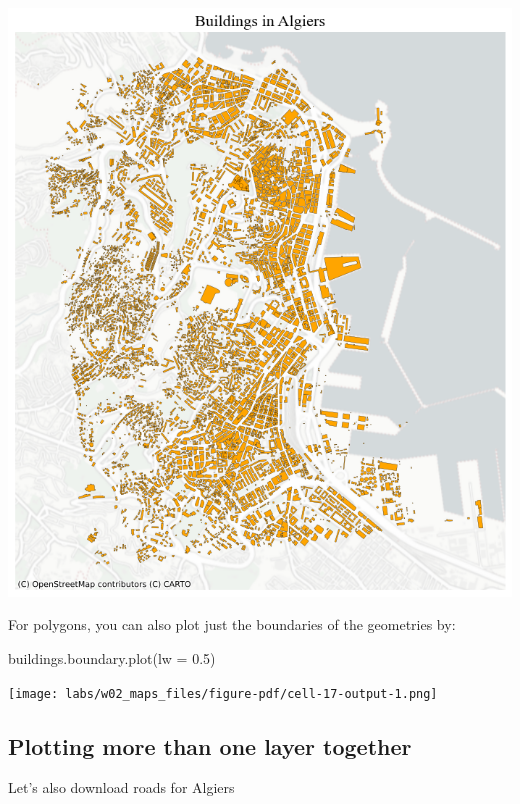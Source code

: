 \documentclass[
  letterpaper,
  DIV=11,
  numbers=noendperiod]{scrreprt}
\newenvironment{Shaded}{\begin{snugshade}}{\end{snugshade}}
\newcommand{\FloatTok}[1]{\textcolor[rgb]{0.68,0.00,0.00}{#1}}
\newcommand{\NormalTok}[1]{\textcolor[rgb]{0.00,0.23,0.31}{#1}}
\newcommand{\OperatorTok}[1]{\textcolor[rgb]{0.37,0.37,0.37}{#1}}
\begin{document}
\includegraphics{labs/w02_maps_files/figure-pdf/cell-16-output-1.png}

For polygons, you can also plot just the boundaries of the geometries
by:

\begin{Shaded}
\begin{Highlighting}[]
\NormalTok{buildings.boundary.plot(lw }\OperatorTok{=} \FloatTok{0.5}\NormalTok{)}
\end{Highlighting}
\end{Shaded}

\texttt{[image: labs/w02\_maps\_files/figure-pdf/cell-17-output-1.png]}

\subsection{Plotting more than one layer
together}\label{plotting-more-than-one-layer-together}

Let's also download roads for Algiers
\end{document}

